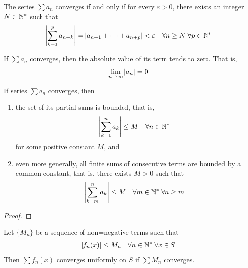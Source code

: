 \documentclass[thmcnt=section, 12pt]{my-elegantbook}
\begin{document}
\begin{theorem} \label{thm:53}
    The series $\sum a_n$ converges if and only if for every $\varepsilon > 0$, there exists an integer $N \in \mathbb{N}^\ast$ such that
    \begin{align*}
        \left\lvert \sum_{k=1}^p a_{n+k} \right\rvert
        = \left\lvert a_{n+1} + \cdots + a_{n+p} \right\rvert
        < \varepsilon
        \quad
        \forall n \geq N \;
        \forall p \in \mathbb{N}^\ast
    \end{align*}
\end{theorem}

\begin{corollary} \label{cor:2}
    If $\sum a_n$ converges, then the absolute value of its term tends to zero. That is,
    \begin{align*}
        \lim_{n \to \infty} \left\lvert a_n \right\rvert = 0
    \end{align*}
\end{corollary}


\begin{theorem} \label{thm:51}
    If series $\sum a_n$ converges, then
    \begin{enumerate}
        \item the set of its partial sums is bounded, that is,
              \begin{align*}
                  \left\lvert \sum_{k=1}^n a_k \right\rvert \leq M
                  \quad \forall n \in \mathbb{N}^\ast
              \end{align*}
              for some positive constant $M$, and
        \item even more generally, all finite sums of consecutive terms are bounded by a common constant, that is, there exists $M > 0$ such that
              \begin{align*}
                  \left\lvert \sum_{k=m}^n a_k \right\rvert \leq M
                  \quad \forall m \in \mathbb{N}^\ast \;
                  \forall n \geq m
              \end{align*}
    \end{enumerate}
\end{theorem}

\begin{proof}
\end{proof}


\begin{theorem} \label{thm:56}
    Let $\{M_n\}$ be a sequence of non=negative terms such that
    \begin{align*}
        \left\lvert f_n(x) \right\rvert \leq M_n
        \quad \forall n \in \mathbb{N}^\ast \;
        \forall x \in S
    \end{align*}
    Then $\sum f_n(x)$ converges uniformly on $S$ if $\sum M_n$ converges.
\end{theorem}
\end{document}
